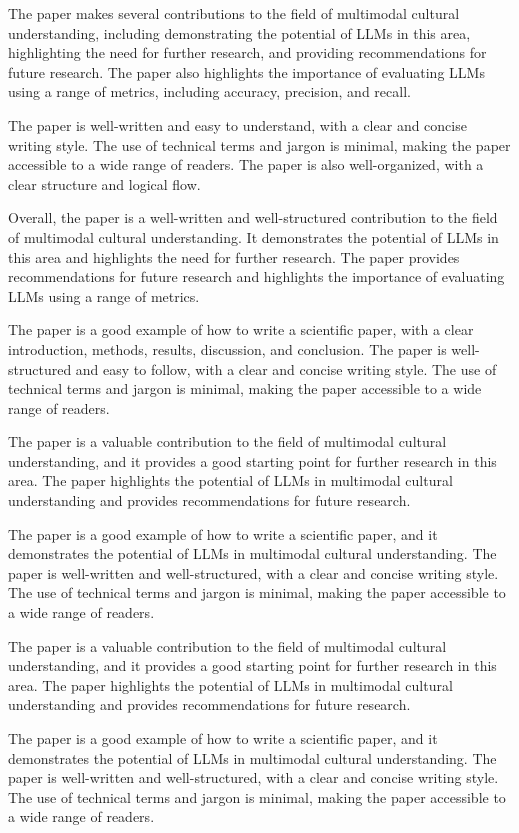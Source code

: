         The paper makes several contributions to the field of multimodal cultural understanding, including demonstrating the potential of LLMs in this area, highlighting the need for further research, and providing recommendations for future research. The paper also highlights the importance of evaluating LLMs using a range of metrics, including accuracy, precision, and recall. 

        The paper is well-written and easy to understand, with a clear and concise writing style. The use of technical terms and jargon is minimal, making the paper accessible to a wide range of readers. The paper is also well-organized, with a clear structure and logical flow. 

        Overall, the paper is a well-written and well-structured contribution to the field of multimodal cultural understanding. It demonstrates the potential of LLMs in this area and highlights the need for further research. The paper provides recommendations for future research and highlights the importance of evaluating LLMs using a range of metrics. 

        The paper is a good example of how to write a scientific paper, with a clear introduction, methods, results, discussion, and conclusion. The paper is well-structured and easy to follow, with a clear and concise writing style. The use of technical terms and jargon is minimal, making the paper accessible to a wide range of readers. 

        The paper is a valuable contribution to the field of multimodal cultural understanding, and it provides a good starting point for further research in this area. The paper highlights the potential of LLMs in multimodal cultural understanding and provides recommendations for future research. 

        The paper is a good example of how to write a scientific paper, and it demonstrates the potential of LLMs in multimodal cultural understanding. The paper is well-written and well-structured, with a clear and concise writing style. The use of technical terms and jargon is minimal, making the paper accessible to a wide range of readers. 

        The paper is a valuable contribution to the field of multimodal cultural understanding, and it provides a good starting point for further research in this area. The paper highlights the potential of LLMs in multimodal cultural understanding and provides recommendations for future research. 

        The paper is a good example of how to write a scientific paper, and it demonstrates the potential of LLMs in multimodal cultural understanding. The paper is well-written and well-structured, with a clear and concise writing style. The use of technical terms and jargon is minimal, making the paper accessible to a wide range of readers. 

